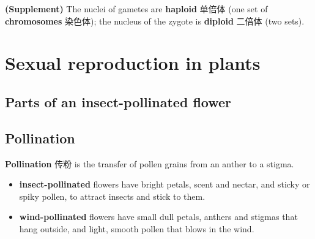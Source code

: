 \documentclass[11pt]{article}
\begin{document}
\textbf{(Supplement)} The nuclei of gametes are \textbf{haploid} 单倍体 (one set of \textbf{chromosomes} 染色体); the nucleus of the zygote is \textbf{diploid} 二倍体 (two sets).

\section*{Sexual reproduction in plants}

\subsection*{Parts of an insect-pollinated flower}

\begin{center}
\end{center}

\subsection*{Pollination}

\textbf{Pollination} 传粉 is the transfer of pollen grains from an anther to a stigma.

\begin{itemize}
\item \textbf{insect-pollinated} flowers have bright petals, scent and nectar, and sticky or spiky pollen, to attract insects and stick to them.

\item \textbf{wind-pollinated} flowers have small dull petals, anthers and stigmas that hang outside, and light, smooth pollen that blows in the wind.

\end{itemize}
\end{document}
